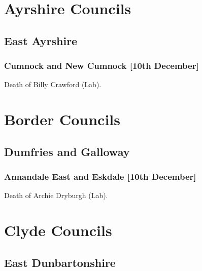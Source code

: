 \documentclass[a4paper,openany]{book}
\begin{document}
\begin{resultsiii}
\section{Ayrshire Councils}

\subsection*{East Ayrshire}

\subsubsection*{Cumnock and New Cumnock \hspace*{\fill}\nolinebreak[1]%
	\enspace\hspace*{\fill}
	[10th December]}


Death of Billy Crawford (Lab).

\section{Border Councils}

\subsection*{Dumfries and Galloway}

\subsubsection*{Annandale East and Eskdale \hspace*{\fill}\nolinebreak[1]%
	\enspace\hspace*{\fill}
	[10th December]}


Death of Archie Dryburgh (Lab).

\section{Clyde Councils}

\subsection*{East Dunbartonshire}


\end{resultsiii}
\end{document}
